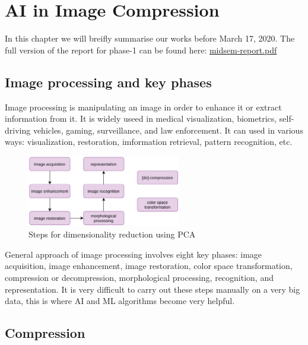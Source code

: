 \chapter{AI in Image Compression}
\label{ch:ai-image-compression}

In this chapter we will breifly summarise our works before March 17, 2020. The full version of the report for phase-1 can be found here: 
\href{https://github.com/KishoreKaushal/btp-report-phase2/blob/master/btp_report.pdf}{midsem-report.pdf}

\section{Image processing and key phases}

Image processing is manipulating an image in order to enhance it or extract information from it. 
It is widely useed in medical visualization, biometrics, self-driving vehicles, gaming, surveillance, and law enforcement. It can used in various ways: visualization, restoration, imformation retrieval, pattern recognition, etc.

\vspace{1em}
\begin{figure}[!ht]
    \label{fig:keyPhasesOfImageProcessing}
    \centering
    \includegraphics[width=0.60\textwidth]{../fig/midsemwork/keyPhasesOfImageProcessing.png}
    \caption{Steps for dimensionality reduction using PCA}
\end{figure}

\pagebreak
General approach of image processing involves eight key phases: image acquisition, image enhancement, image restoration, color space transformation, compression or decompression, morphological processing, recognition, and representation. 
It is very difficult to carry out these steps manually on a very big data, this is where AI and ML algorithms become very helpful.



\section{Compression}

